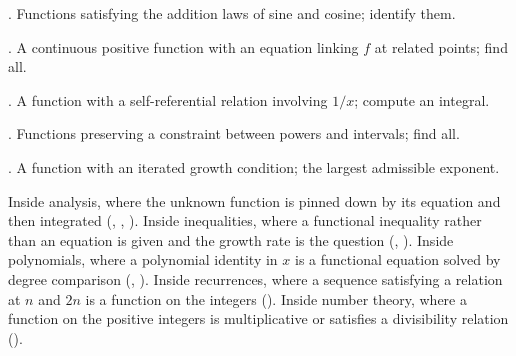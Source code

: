 \begin{ladder}
\item {}. Functions satisfying the addition laws of sine and cosine; identify them.
\item {}. A continuous positive function with an equation linking $f$ at related points; find all.
\item {}. A function with a self-referential relation involving $1/x$; compute an integral.
\item {}. Functions preserving a constraint between powers and intervals; find all.
\item {}. A function with an iterated growth condition; the largest admissible exponent.
\end{ladder}

\begin{hides}
Inside analysis, where the unknown function is pinned down by its equation and then integrated (, , ). Inside inequalities, where a functional inequality rather than an equation is given and the growth rate is the question (, ). Inside polynomials, where a polynomial identity in $x$ is a functional equation solved by degree comparison (, ). Inside recurrences, where a sequence satisfying a relation at $n$ and $2n$ is a function on the integers (). Inside number theory, where a function on the positive integers is multiplicative or satisfies a divisibility relation ().
\end{hides}
